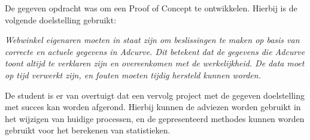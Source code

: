 De gegeven opdracht was om een Proof of Concept te ontwikkelen. Hierbij is de volgende doelstelling gebruikt:

\textit{Webwinkel eigenaren moeten in staat zijn om beslissingen te maken op basis van correcte en actuele gegevens in Adcurve. Dit betekent dat de gegevens die Adcurve toont altijd te verklaren zijn en overeenkomen met de werkelijkheid. De data moet op tijd verwerkt zijn, en fouten moeten tijdig hersteld kunnen worden.}

De student is er van overtuigt dat een vervolg project met de gegeven doelstelling met succes kan worden afgerond. Hierbij kunnen de adviezen worden gebruikt in het wijzigen van huidige processen, en de gepresenteerd methodes kunnen worden gebruikt voor het berekenen van statistieken.